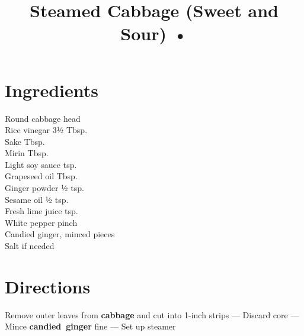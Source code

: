 \documentclass[11pt,letterpaper]{article}
\title{Steamed Cabbage (Sweet and Sour) •}
\author{}
\date{}
\begin{document}
\maketitle
\thispagestyle{empty}

\section*{Ingredients}
\setlength{\columnsep}{20pt}
\begin{multicols}{2}
\noindent
    Round cabbage  head \\
    Rice vinegar \dotfill 3½ Tbsp. \\
    Sake  Tbsp. \\
    Mirin  Tbsp. \\
    Light soy sauce  tsp. \\
    \columnbreak
    Grapeseed oil  Tbsp. \\
    Ginger powder \dotfill ½ tsp. \\
    Sesame oil \dotfill ½ tsp. \\
    Fresh lime juice  tsp. \\
    White pepper \dotfill pinch \\
    Candied ginger, minced  pieces \\
    Salt \dotfill if needed \\
\end{multicols}

\section*{Directions}

\noindent
Remove outer leaves from \textbf{cabbage} and cut into 1-inch strips ---
Discard core ---
Mince \textbf{candied~ginger} fine ---
Set up steamer
\end{document}
